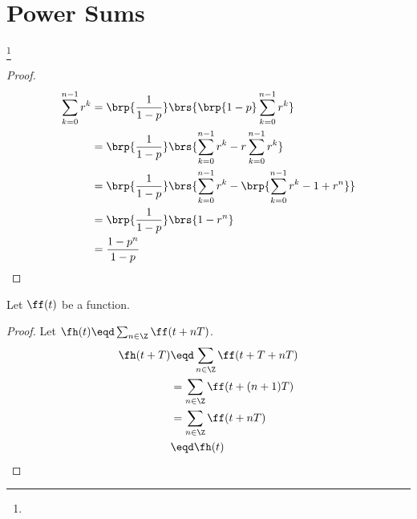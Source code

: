 \section{Power Sums}
\begin{theorem}
\footnote{
  }
\label{thm:series_geometric}
\end{theorem}
\begin{proof}
\begin{align*}
  \sum_{k=0}^{n-1} r^k
    &= \brp{\frac{1}{1-p}}\brs{\brp{1-p}\sum_{k=0}^{n-1} r^k}
  \\&= \brp{\frac{1}{1-p}}\brs{\sum_{k=0}^{n-1} r^k - r\sum_{k=0}^{n-1} r^k}
  \\&= \brp{\frac{1}{1-p}}\brs{\sum_{k=0}^{n-1} r^k - \brp{\sum_{k=0}^{n-1} r^k -1 + r^n}}
  \\&= \brp{\frac{1}{1-p}}\brs{1 - r^n}
  \\&= \frac{1-p^n}{1-p}
\end{align*}
\end{proof}

\begin{lemma}
\label{lem:series_sumT}
Let $\ff(t)$ be a function.
\end{lemma}
\begin{proof}
Let $\fh(t) \eqd \sum_{n\in\Z} \ff(t+nT)$.
\begin{align*} 
  \fh(t+T) 
    &\eqd \sum_{n\in\Z} \ff(t+T+nT) 
  \\&=    \sum_{n\in\Z} \ff(t+(n+1)T) 
  \\&=    \sum_{n\in\Z} \ff(t+nT) 
  \\&\eqd \fh(t)
\end{align*}
\end{proof}


